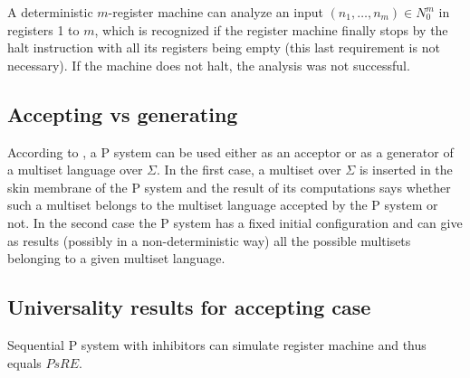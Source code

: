 \documentclass[a4paper,10pt]{article}
\begin{document}
  A deterministic $m$-register machine can analyze an input $(n_1,\dots,n_m)\in N_0^m$ in registers 1 to $m$, which is recognized if the register machine finally stops by the halt instruction with all its registers being empty (this last requirement is not necessary). If the machine does not halt, the analysis was not successful.


\subsection{Accepting vs generating} %
\label{sub:accepting_vs_generating}
  According to \cite{Barbuti:2010:MSW:1946067.1946081}, a P system can be used either as an acceptor or as a generator of a multiset language over $\Sigma$. In the first case, a multiset over $\Sigma$ is inserted in the skin membrane of the P system and the result of its computations says whether such a multiset belongs to the multiset language accepted by the P system or not. In the second case the P system has a fixed initial configuration and can give as results (possibly in a non-deterministic way) all the possible multisets belonging to a given multiset language.


\subsection{Universality results for accepting case} %
\label{sub:universality_results_for_accepting_case}

\begin{veta}
  Sequential P system with inhibitors can simulate register machine and thus equals $PsRE$.
\end{veta}
\end{document}
